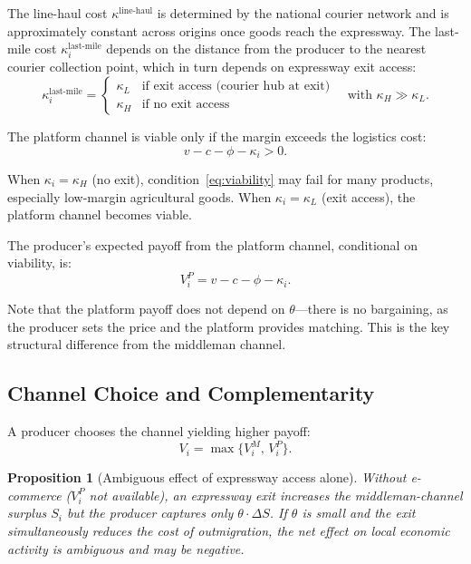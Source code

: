 \documentclass[12pt]{article}
\newtheorem{proposition}{Proposition}
\begin{document}
The line-haul cost $\kappa^{\text{line-haul}}$ is determined by the national courier network and is approximately constant across origins once goods reach the expressway. The last-mile cost $\kappa^{\text{last-mile}}_i$ depends on the distance from the producer to the nearest courier collection point, which in turn depends on expressway exit access:
\begin{equation}
    \kappa^{\text{last-mile}}_i =
    \begin{cases}
        \kappa_L & \text{if exit access (courier hub at exit)} \\
        \kappa_H & \text{if no exit access}
    \end{cases}
    \quad \text{with } \kappa_H \gg \kappa_L.
\end{equation}

The platform channel is viable only if the margin exceeds the logistics cost:
\begin{equation}\label{eq:viability}
    v - c - \phi - \kappa_i > 0.
\end{equation}

When $\kappa_i = \kappa_H$ (no exit), condition~\eqref{eq:viability} may fail for many products, especially low-margin agricultural goods. When $\kappa_i = \kappa_L$ (exit access), the platform channel becomes viable.

The producer's expected payoff from the platform channel, conditional on viability, is:
\begin{equation}
    V^P_i = v - c - \phi - \kappa_i.
\end{equation}

Note that the platform payoff does not depend on $\theta$---there is no bargaining, as the producer sets the price and the platform provides matching. This is the key structural difference from the middleman channel.

\subsection{Channel Choice and Complementarity}

A producer chooses the channel yielding higher payoff:
\begin{equation}
    V_i = \max\{V^M_i, \, V^P_i\}.
\end{equation}

\begin{proposition}[Ambiguous effect of expressway access alone]\label{prop:exit}
Without e-commerce ($V^P_i$ not available), an expressway exit increases the middleman-channel surplus $S_i$ but the producer captures only $\theta \cdot \Delta S$. If $\theta$ is small and the exit simultaneously reduces the cost of outmigration, the net effect on local economic activity is ambiguous and may be negative.
\end{proposition}
\end{document}
